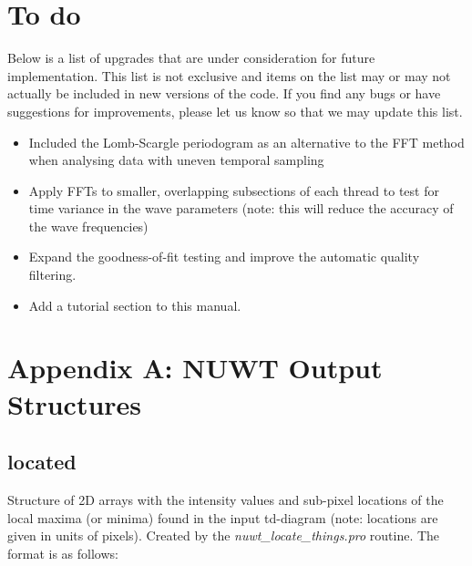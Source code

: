 \documentclass{article}
\begin{document}
\section{To do}
Below is a list of upgrades that are under consideration for future implementation. This list is not exclusive and items on the list may or may not actually be included in new versions of the code. If you find any bugs or have suggestions for improvements, please let us know so that we may update this list.\\
\begin{itemize}
\item Included the Lomb-Scargle periodogram as an alternative to the FFT method when analysing data with uneven temporal sampling
\item Apply FFTs to smaller, overlapping subsections of each thread to test for time variance in the wave parameters (note: this will reduce the accuracy of the wave frequencies) 
\item Expand the goodness-of-fit testing and improve the automatic quality filtering.
\item Add a tutorial section to this manual.
\end{itemize}


\appendix
\section{Appendix A: NUWT Output Structures}


\subsection{located} 
Structure of 2D arrays with the intensity values and sub-pixel locations of the local maxima (or minima) found in the input td-diagram (note: locations are given in units of pixels). Created by the \textit{nuwt\_locate\_things.pro} routine. The format is as follows:
\end{document}
